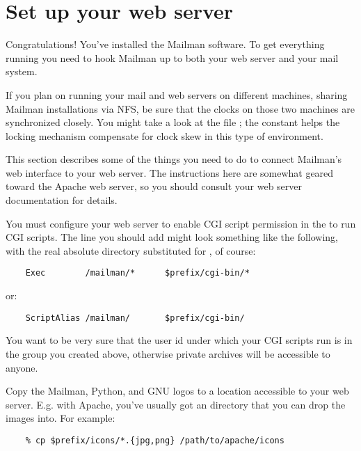 \documentclass{howto}
\begin{document}
\section{Set up your web server}

Congratulations!  You've installed the Mailman software.  To get everything
running you need to hook Mailman up to both your web server and your mail
system.

If you plan on running your mail and web servers on different machines,
sharing Mailman installations via NFS, be sure that the clocks on those two
machines are synchronized closely.  You might take a look at the file
; the constant  helps the locking
mechanism compensate for clock skew in this type of environment.

This section describes some of the things you need to do to connect Mailman's
web interface to your web server.  The instructions here are somewhat geared
toward the Apache web server, so you should consult your web server
documentation for details.

You must configure your web server to enable CGI script permission in the
 to run CGI scripts.  The line you should add
might look something like the following, with the real absolute directory
substituted for , of course:

\begin{verbatim}
    Exec        /mailman/*      $prefix/cgi-bin/*
\end{verbatim}

  or:

\begin{verbatim}
    ScriptAlias /mailman/       $prefix/cgi-bin/
\end{verbatim}

\begin{notice}[warning]
You want to be very sure that the user id under which your CGI scripts run is
 in the  group you created above, otherwise private
archives will be accessible to anyone.
\end{notice}

Copy the Mailman, Python, and GNU logos to a location accessible to your web
server.  E.g. with Apache, you've usually got an  directory that
you can drop the images into.  For example:

\begin{verbatim}
    % cp $prefix/icons/*.{jpg,png} /path/to/apache/icons
\end{verbatim}
\end{document}
